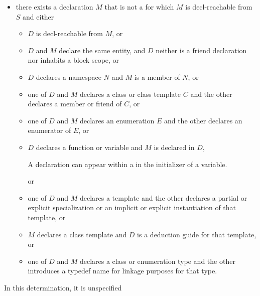 \begin{itemize}
\item
there exists a declaration $M$ that is not a 
for which $M$ is decl-reachable from $S$ and either
\begin{itemize}
\item
$D$ is decl-reachable from $M$, or
\item
$D$ and $M$ declare the same entity,
and $D$ neither is a friend declaration
nor inhabits a block scope, or
\item
$D$ declares a namespace $N$ and $M$ is a member of $N$, or
\item
one of $D$ and $M$ declares a class or class template $C$
and the other declares a member or friend of $C$, or
\item
one of $D$ and $M$ declares an enumeration $E$
and the other declares an enumerator of $E$, or
\item
$D$ declares a function or variable and $M$ is declared in $D$,
\begin{footnote}
A declaration can appear within a 
in the initializer of a variable.
\end{footnote}
or
\item
one of $D$ and $M$ declares a template and the other declares
a partial or explicit specialization or
an implicit or explicit instantiation of that template, or
\item
$M$ declares a class template
and $D$ is a deduction guide for that template, or
\item
one of $D$ and $M$ declares a class or enumeration type
and the other introduces a typedef name for linkage purposes for that type.
\end{itemize}
\end{itemize}
In this determination, it is unspecified
